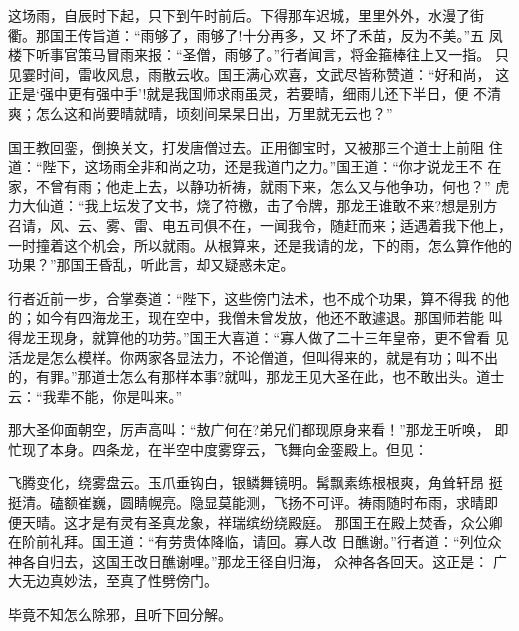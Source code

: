 这场雨，自辰时下起，只下到午时前后。下得那车迟城，里里外外，水漫了街
衢。那国王传旨道：“雨够了，雨够了!十分再多，又坏了禾苗，反为不美。”五
凤楼下听事官策马冒雨来报：“圣僧，雨够了。”行者闻言，将金箍棒往上又一指。
只见霎时间，雷收风息，雨散云收。国王满心欢喜，文武尽皆称赞道：“好和尚，
这正是‘强中更有强中手’!就是我国师求雨虽灵，若要晴，细雨儿还下半日，便
不清爽；怎么这和尚要晴就晴，顷刻间杲杲日出，万里就无云也？”

国王教回銮，倒换关文，打发唐僧过去。正用御宝时，又被那三个道士上前阻
住道：“陛下，这场雨全非和尚之功，还是我道门之力。”国王道：“你才说龙王不
在家，不曾有雨；他走上去，以静功祈祷，就雨下来，怎么又与他争功，何也？”
虎力大仙道：“我上坛发了文书，烧了符檄，击了令牌，那龙王谁敢不来?想是别方
召请，风、云、雾、雷、电五司俱不在，一闻我令，随赶而来；适遇着我下他上，
一时撞着这个机会，所以就雨。从根算来，还是我请的龙，下的雨，怎么算作他的
功果？”那国王昏乱，听此言，却又疑惑未定。

行者近前一步，合掌奏道：“陛下，这些傍门法术，也不成个功果，算不得我
的他的；如今有四海龙王，现在空中，我僧未曾发放，他还不敢遽退。那国师若能
叫得龙王现身，就算他的功劳。”国王大喜道：“寡人做了二十三年皇帝，更不曾看
见活龙是怎么模样。你两家各显法力，不论僧道，但叫得来的，就是有功；叫不出
的，有罪。”那道士怎么有那样本事?就叫，那龙王见大圣在此，也不敢出头。道士
云：“我辈不能，你是叫来。”

那大圣仰面朝空，厉声高叫：“敖广何在?弟兄们都现原身来看！”那龙王听唤，
即忙现了本身。四条龙，在半空中度雾穿云，飞舞向金銮殿上。但见：

飞腾变化，绕雾盘云。玉爪垂钩白，银鳞舞镜明。髯飘素练根根爽，角耸轩昂
挺挺清。磕额崔巍，圆睛幌亮。隐显莫能测，飞扬不可评。祷雨随时布雨，求晴即
便天晴。这才是有灵有圣真龙象，祥瑞缤纷绕殿庭。
那国王在殿上焚香，众公卿在阶前礼拜。国王道：“有劳贵体降临，请回。寡人改
日醮谢。”行者道：“列位众神各自归去，这国王改日醮谢哩。”那龙王径自归海，
众神各各回天。这正是：
广大无边真妙法，至真了性劈傍门。

毕竟不知怎么除邪，且听下回分解。